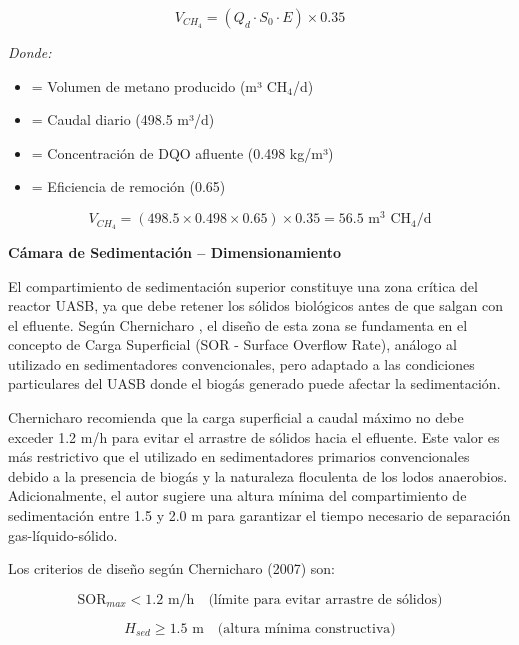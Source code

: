\documentclass[12pt,a4paper]{article}
\begin{document}
\begin{equation}
V_{CH_4} = (Q_d \cdot S_0 \cdot E) \times 0.35
\end{equation}

\textit{Donde:}
\begin{itemize}[noitemsep,leftmargin=2em]
    \item[$V_{CH_4}$] = Volumen de metano producido (m³ CH$_4$/d)
    \item[$Q_d$] = Caudal diario (498.5 m³/d)
    \item[$S_0$] = Concentración de DQO afluente (0.498 kg/m³)
    \item[$E$] = Eficiencia de remoción (0.65)
\end{itemize}

\begin{equation}
V_{CH_4} = (498.5 \times 0.498 \times 0.65) \times 0.35 = 56.5 \text{ m}^3 \text{ CH}_4\text{/d}
\end{equation}

\textbf{Cámara de Sedimentación -- Dimensionamiento}

El compartimiento de sedimentación superior constituye una zona crítica del reactor UASB, ya que debe retener los sólidos biológicos antes de que salgan con el efluente. Según Chernicharo \cite{chernicharo2007}, el diseño de esta zona se fundamenta en el concepto de Carga Superficial (SOR - Surface Overflow Rate), análogo al utilizado en sedimentadores convencionales, pero adaptado a las condiciones particulares del UASB donde el biogás generado puede afectar la sedimentación.

Chernicharo recomienda que la carga superficial a caudal máximo no debe exceder 1.2 m/h para evitar el arrastre de sólidos hacia el efluente. Este valor es más restrictivo que el utilizado en sedimentadores primarios convencionales debido a la presencia de biogás y la naturaleza floculenta de los lodos anaerobios. Adicionalmente, el autor sugiere una altura mínima del compartimiento de sedimentación entre 1.5 y 2.0 m para garantizar el tiempo necesario de separación gas-líquido-sólido.

Los criterios de diseño según Chernicharo (2007) son:

\begin{equation}
\text{SOR}_{max} < 1.2 \text{ m/h} \quad \text{(límite para evitar arrastre de sólidos)}
\end{equation}

\begin{equation}
H_{sed} \geq 1.5 \text{ m} \quad \text{(altura mínima constructiva)}
\end{equation}
\end{document}
